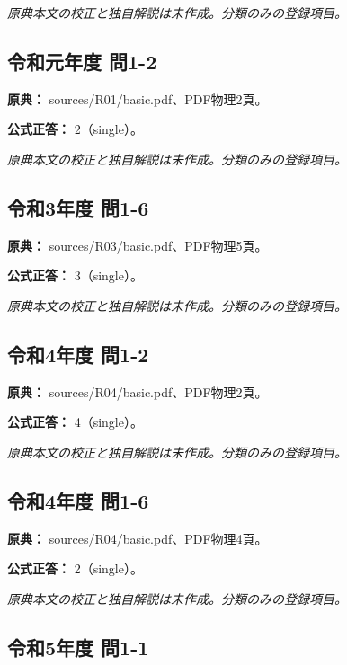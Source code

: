 \par\textit{原典本文の校正と独自解説は未作成。分類のみの登録項目。}

\subsection{令和元年度 問1-2}
\label{q:r01-reg-basic-1-2}

\noindent\textbf{原典：} sources/R01/basic.pdf、PDF物理2頁。

\textbf{公式正答：} 2（single）。

\par\textit{原典本文の校正と独自解説は未作成。分類のみの登録項目。}

\subsection{令和3年度 問1-6}
\label{q:r03-reg-basic-1-6}

\noindent\textbf{原典：} sources/R03/basic.pdf、PDF物理5頁。

\textbf{公式正答：} 3（single）。

\par\textit{原典本文の校正と独自解説は未作成。分類のみの登録項目。}

\subsection{令和4年度 問1-2}
\label{q:r04-reg-basic-1-2}

\noindent\textbf{原典：} sources/R04/basic.pdf、PDF物理2頁。

\textbf{公式正答：} 4（single）。

\par\textit{原典本文の校正と独自解説は未作成。分類のみの登録項目。}

\subsection{令和4年度 問1-6}
\label{q:r04-reg-basic-1-6}

\noindent\textbf{原典：} sources/R04/basic.pdf、PDF物理4頁。

\textbf{公式正答：} 2（single）。

\par\textit{原典本文の校正と独自解説は未作成。分類のみの登録項目。}

\subsection{令和5年度 問1-1}
\label{q:r05-reg-basic-1-1}

